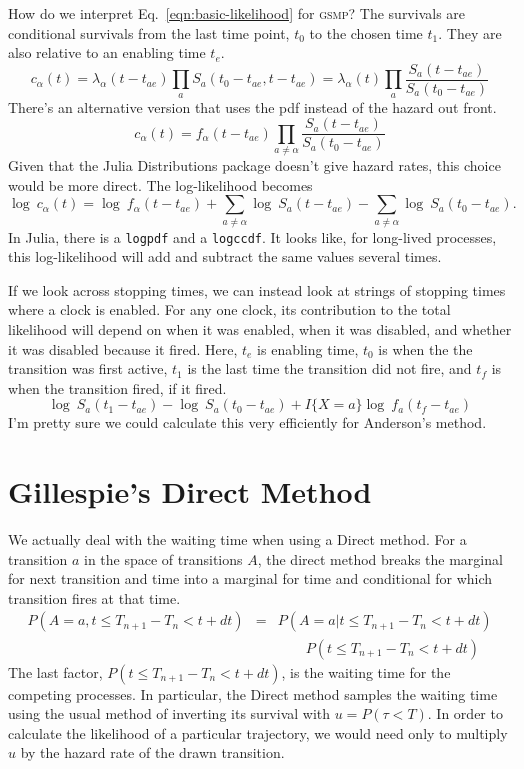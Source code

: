 \documentclass{article}
\newcommand{\gsmp}{\textsc{gsmp}\xspace}
\begin{document}
How do we interpret Eq.~\ref{eqn:basic-likelihood} for \gsmp? The survivals are conditional survivals from the last time point, $t_0$ to the chosen time $t_1$. They are also relative to an enabling time $t_{e}$.
\begin{equation}
  c_{\alpha}(t) = \lambda_\alpha(t-t_{ae})\prod_a S_a(t_0-t_{ae},t-t_{ae}) = \lambda_\alpha(t)\prod_a \frac{S_a(t-t_{ae})}{S_a(t_0-t_{ae})}
\end{equation}
There's an alternative version that uses the pdf instead of the hazard out front.
\begin{equation}
  c_{\alpha}(t) = f_\alpha(t-t_{ae})\prod_{a\ne\alpha} \frac{S_a(t-t_{ae})}{S_a(t_0-t_{ae})}
\end{equation}
Given that the Julia Distributions package doesn't give hazard rates, this choice would be more direct. The log-likelihood becomes
\begin{equation}
  \log\:c_{\alpha}(t) = \log\:f_\alpha(t-t_{ae})+\sum_{a\ne\alpha} \log\:S_a(t-t_{ae}) - \sum_{a\ne\alpha} \log\:S_a(t_0-t_{ae}).
\end{equation}
In Julia, there is a \texttt{logpdf} and a \texttt{logccdf}. It looks like, for long-lived processes, this log-likelihood will add and subtract the same values several times.

If we look across stopping times, we can instead look at strings of stopping times where a clock is enabled. For any one clock, its contribution to the total likelihood will depend on when it was enabled, when it was disabled, and whether it was disabled because it fired. Here, $t_e$ is enabling time, $t_0$ is when the the transition was first active, $t_1$ is the last time the transition did not fire, and $t_f$ is when the transition fired, if it fired.
\begin{equation}
  \log\:S_a(t_1-t_{ae}) - \log\:S_a(t_0-t_{ae}) + I\{X=a\}\log\:f_a(t_f-t_{ae})
\end{equation}
I'm pretty sure we could calculate this very efficiently for Anderson's method.


\section{Gillespie's Direct Method}

We actually deal with the waiting time when using a Direct method. For a transition $a$ in the space of transitions $A$, the direct method breaks the marginal for next transition and time into a marginal for time and conditional for which transition fires at that time.
\begin{eqnarray*}
	P(A=a, t\le T_{n+1}-T_n<t+dt) &=& P(A=a|t\le T_{n+1}-T_n<t+dt) \\
	& & \qquad P(t\le T_{n+1}-T_n<t+dt)
\end{eqnarray*}
The last factor, $P(t\le T_{n+1}-T_n<t+dt)$, is the waiting time for the competing processes. In particular, the Direct method samples the waiting time using the usual method of inverting its survival with $u=P(\tau<T)$. In order to calculate the likelihood of a particular trajectory, we would need only to multiply $u$ by the hazard rate of the drawn transition.
\end{document}
